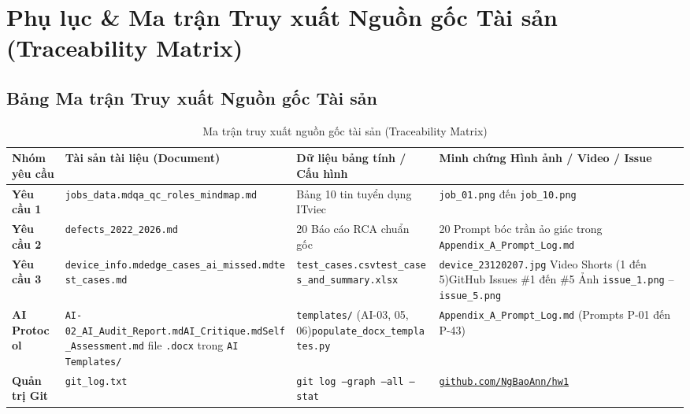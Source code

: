 \documentclass[11pt,a4paper]{article}
\newcommand{\filepath}[1]{\nolinkurl{#1}}
\begin{document}
\section{Phụ lục \& Ma trận Truy xuất Nguồn gốc Tài sản (Traceability Matrix)}

\subsection{Bảng Ma trận Truy xuất Nguồn gốc Tài sản}
\begin{table}[htbp]
\centering
\small
\begin{tabularx}{\textwidth}{@{} p{2.2cm} p{3.8cm} p{3.8cm} X @{}}
\toprule
\textbf{Nhóm yêu cầu} & \textbf{Tài sản tài liệu (Document)} & \textbf{Dữ liệu bảng tính / Cấu hình} & \textbf{Minh chứng Hình ảnh / Video / Issue} \\
\midrule
\textbf{Yêu cầu 1} & \filepath{jobs_data.md}\newline \filepath{qa_qc_roles_mindmap.md} & Bảng 10 tin tuyển dụng ITviec & \filepath{job_01.png} đến \filepath{job_10.png} \\
\midrule
\textbf{Yêu cầu 2} & \filepath{defects_2022_2026.md} & 20 Báo cáo RCA chuẩn gốc & 20 Prompt bóc trần ảo giác trong \filepath{Appendix_A_Prompt_Log.md} \\
\midrule
\textbf{Yêu cầu 3} & \filepath{device_info.md}\newline \filepath{edge_cases_ai_missed.md}\newline \filepath{test_cases.md} & \filepath{test_cases.csv}\newline \filepath{test_cases_and_summary.xlsx} & \filepath{device_23120207.jpg}\newline 5 Video Shorts (1 đến 5)\newline GitHub Issues \#1 đến \#5\newline 5 Ảnh \filepath{issue_1.png} -- \filepath{issue_5.png} \\
\midrule
\textbf{AI Protocol} & \filepath{AI-02_AI_Audit_Report.md}\newline \filepath{AI_Critique.md}\newline \filepath{Self_Assessment.md}\newline 4 file \texttt{.docx} trong \filepath{AI Templates/} & \filepath{templates/} (AI-03, 05, 06)\newline \filepath{populate_docx_templates.py} & \filepath{Appendix_A_Prompt_Log.md} (Prompts P-01 đến P-43) \\
\midrule
\textbf{Quản trị Git} & \filepath{git_log.txt} & \texttt{git log --graph --all --stat} & \href{https://github.com/NgBaoAnn/hw1}{\nolinkurl{github.com/NgBaoAnn/hw1}} \\
\bottomrule
\end{tabularx}
\caption{Ma trận truy xuất nguồn gốc tài sản (Traceability Matrix)}
\end{table}
\end{document}

